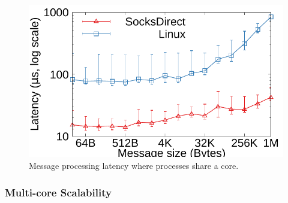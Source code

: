 \begin{figure}[t!]
\begin{minipage}{.31\textwidth}
		
	\end{minipage}
	\vspace{-15pt}
\end{figure}

\begin{figure}[t!]
	\centering

	\hspace{0.01\textwidth}
		
		\centering \includegraphics[width=\textwidth]{eval/web/msgsize-clocal-lat.pdf}
		\vspace{-15pt}
		\caption{Message processing latency where processes share a core.}
		\label{fig:eval-nginx}
	\vspace{-15pt}
\end{figure}

\subsubsection{Multi-core Scalability}
\quad

